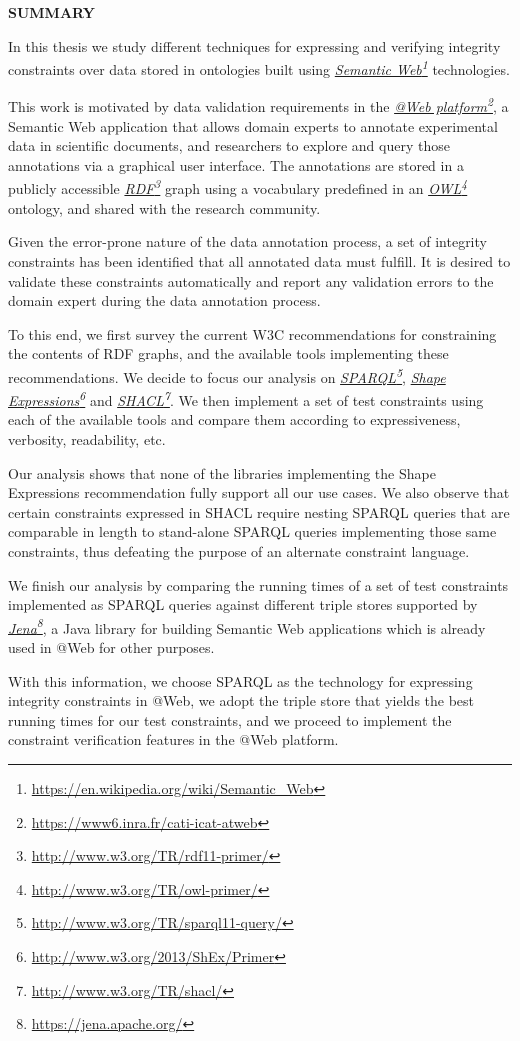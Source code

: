 \documentclass[a4paper, 10pt]{article}
\newcommand{\header}[1]{
  \begin{center}
    \textbf{\uppercase{#1}}
  \end{center}
  \vspace{-1em}
}
\newcommand{\fnhref}[2]{\href{#2}{#1}\footnote{\url{#2}}}
\newcommand{\ifnhref}[2]{\textit{\fnhref{#1}{#2}}}
\begin{document}
\header{Summary}

In this thesis we study different techniques for expressing and verifying
integrity constraints over data stored in ontologies built using
\ifnhref{Semantic Web}{https://en.wikipedia.org/wiki/Semantic\_Web}
technologies.

This work is motivated by data validation requirements in the \ifnhref{@Web
platform}{https://www6.inra.fr/cati-icat-atweb}, a Semantic Web application
that allows domain experts to annotate experimental data in scientific
documents, and researchers to explore and query those annotations via a
graphical user interface. The annotations are stored in a publicly accessible
\ifnhref{RDF}{http://www.w3.org/TR/rdf11-primer/} graph using a vocabulary
predefined in an \ifnhref{OWL}{http://www.w3.org/TR/owl-primer/} ontology, and
shared with the research community.

Given the error-prone nature of the data annotation process, a set of integrity
constraints has been identified that all annotated data must fulfill. It is
desired to validate these constraints automatically and report any validation
errors to the domain expert during the data annotation process.

To this end, we first survey the current W3C recommendations for constraining
the contents of RDF graphs, and the available tools implementing these
recommendations. We decide to focus our analysis on
\ifnhref{SPARQL}{http://www.w3.org/TR/sparql11-query/}, \ifnhref{Shape
Expressions}{http://www.w3.org/2013/ShEx/Primer} and
\ifnhref{SHACL}{http://www.w3.org/TR/shacl/}. We then implement a set of test
constraints using each of the available tools and compare them according to
expressiveness, verbosity, readability, etc.

Our analysis shows that none of the libraries implementing the Shape
Expressions recommendation fully support all our use cases. We also observe
that certain constraints expressed in SHACL require nesting SPARQL queries that
are comparable in length to stand-alone SPARQL queries implementing those same
constraints, thus defeating the purpose of an alternate constraint language.

We finish our analysis by comparing the running times of a set of test
constraints implemented as SPARQL queries against different triple stores
supported by \ifnhref{Jena}{https://jena.apache.org/}, a Java library for
building Semantic Web applications which is already used in @Web for other
purposes.

With this information, we choose SPARQL as the technology for expressing
integrity constraints in @Web, we adopt the triple store that yields the best
running times for our test constraints, and we proceed to implement the
constraint verification features in the @Web platform.
\end{document}
